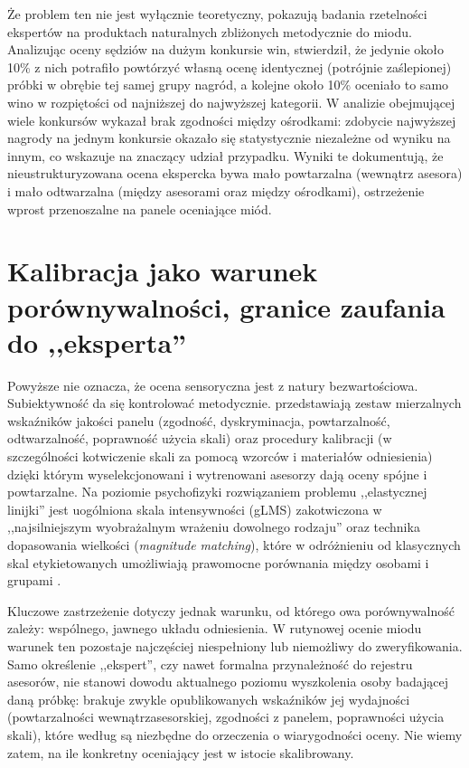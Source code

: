 \documentclass[12pt,a4paper]{article}
\begin{document}
Że problem ten nie jest wyłącznie teoretyczny, pokazują badania rzetelności ekspertów na
produktach naturalnych zbliżonych metodycznie do miodu. Analizując oceny sędziów na dużym
konkursie win, \cite{hodgson2008judge} stwierdził, że jedynie około 10\% z nich potrafiło
powtórzyć własną ocenę identycznej (potrójnie zaślepionej) próbki w obrębie tej samej grupy
nagród, a kolejne około 10\% oceniało to samo wino w rozpiętości od najniższej do najwyższej
kategorii. W analizie obejmującej wiele konkursów \cite{hodgson2009concordance} wykazał brak
zgodności między ośrodkami: zdobycie najwyższej nagrody na jednym konkursie okazało się
statystycznie niezależne od wyniku na innym, co wskazuje na znaczący udział przypadku. Wyniki te
dokumentują, że nieustrukturyzowana ocena ekspercka bywa mało powtarzalna (wewnątrz asesora)
i mało odtwarzalna (między asesorami oraz między ośrodkami), ostrzeżenie wprost przenoszalne
na panele oceniające miód.
 
\section{Kalibracja jako warunek porównywalności, granice zaufania do ,,eksperta''}
 
Powyższe nie oznacza, że ocena sensoryczna jest z natury bezwartościowa. Subiektywność da się
kontrolować metodycznie. \cite{sipos2021panel} przedstawiają zestaw mierzalnych wskaźników
jakości panelu (zgodność, dyskryminacja, powtarzalność, odtwarzalność, poprawność użycia skali)
oraz procedury kalibracji (w szczególności kotwiczenie skali za pomocą wzorców i materiałów
odniesienia) dzięki którym wyselekcjonowani i wytrenowani asesorzy dają oceny spójne
i powtarzalne. Na poziomie psychofizyki rozwiązaniem problemu ,,elastycznej linijki'' jest
uogólniona skala intensywności (gLMS) zakotwiczona w ,,najsilniejszym wyobrażalnym wrażeniu
dowolnego rodzaju'' oraz technika dopasowania wielkości (\emph{magnitude matching}), które
w odróżnieniu od klasycznych skal etykietowanych umożliwiają prawomocne porównania między
osobami i grupami \cite{bartoshuk2004valid}.
 
Kluczowe zastrzeżenie dotyczy jednak warunku, od którego owa porównywalność zależy: wspólnego,
jawnego układu odniesienia. W rutynowej ocenie miodu warunek ten pozostaje najczęściej
niespełniony lub niemożliwy do zweryfikowania. Samo określenie ,,ekspert'', czy nawet formalna
przynależność do rejestru asesorów, nie stanowi dowodu aktualnego poziomu wyszkolenia osoby
badającej daną próbkę: brakuje zwykle opublikowanych wskaźników jej wydajności (powtarzalności
wewnątrzasesorskiej, zgodności z panelem, poprawności użycia skali), które według
\cite{sipos2021panel} są niezbędne do orzeczenia o wiarygodności oceny. Nie wiemy zatem, na ile
konkretny oceniający jest w istocie skalibrowany.
 
\end{document}

